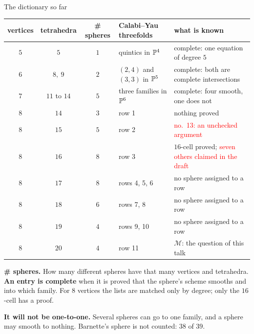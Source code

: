 \begin{frame}{The dictionary so far}
{\centering\footnotesize
\renewcommand{\arraystretch}{0.95}\setlength{\tabcolsep}{4pt}
\begin{tabular}{cccll}
vertices & tetrahedra & \# spheres & Calabi--Yau threefolds & what is known\\ \hline
\(5\) & \(5\) & \(1\) & quintics in \(\mathbb P^4\) & complete: one equation of degree \(5\)\\
\(6\) & \(8,\ 9\) & \(2\) & \((2,4)\) and \((3,3)\) in \(\mathbb P^5\) & complete: both are complete intersections\\
\(7\) & \(11\) to \(14\) & \(5\) & three families in \(\mathbb P^6\) & complete: four smooth, one does not\\ \hline
\(8\) & \(14\) & \(3\) & row 1 & nothing proved\\
\(8\) & \(15\) & \(5\) & row 2 & \textcolor{red}{no.\ 13: an unchecked argument}\\
\(8\) & \(16\) & \(8\) & row 3 & \(16\)-cell proved; \textcolor{red}{seven others claimed in the draft}\\
\(8\) & \(17\) & \(8\) & rows 4, 5, 6 & no sphere assigned to a row\\
\(8\) & \(18\) & \(6\) & rows 7, 8 & no sphere assigned to a row\\
\(8\) & \(19\) & \(4\) & rows 9, 10 & no sphere assigned to a row\\
\(8\) & \(20\) & \(4\) & row 11 & \(\mathcal M\): the question of this talk
\end{tabular}\par}\smallskip
{\footnotesize\textbf{\# spheres.} How many different spheres have that many vertices and tetrahedra. \textbf{An entry is complete} when it is proved that the sphere's scheme smooths and into which family. For \(8\) vertices the lists are matched only by degree; only the \(16\)-cell has a proof.
\par
\textbf{It will not be one-to-one.} Several spheres can go to one family, and a sphere may smooth to nothing. Barnette's sphere is not counted: \(38\) of \(39\).\par}
\end{frame}

